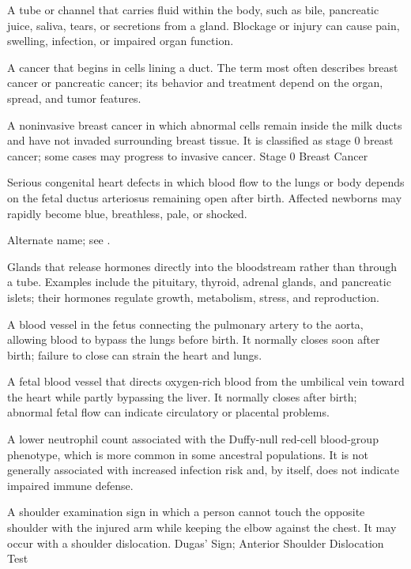  A tube or channel that carries fluid within the body, such as bile, pancreatic juice, saliva, tears, or secretions from a gland. Blockage or injury can cause pain, swelling, infection, or impaired organ function.

 A cancer that begins in cells lining a duct. The term most often describes breast cancer or pancreatic cancer; its behavior and treatment depend on the organ, spread, and tumor features.

 A noninvasive breast cancer in which abnormal cells remain inside the milk ducts and have not invaded surrounding breast tissue. It is classified as stage 0 breast cancer; some cases may progress to invasive cancer.
\synonyms
Stage 0 Breast Cancer

 Serious congenital heart defects in which blood flow to the lungs or body depends on the fetal ductus arteriosus remaining open after birth. Affected newborns may rapidly become blue, breathless, pale, or shocked.

 Alternate name; see .

 Glands that release hormones directly into the bloodstream rather than through a tube. Examples include the pituitary, thyroid, adrenal glands, and pancreatic islets; their hormones regulate growth, metabolism, stress, and reproduction.

 A blood vessel in the fetus connecting the pulmonary artery to the aorta, allowing blood to bypass the lungs before birth. It normally closes soon after birth; failure to close can strain the heart and lungs.

 A fetal blood vessel that directs oxygen-rich blood from the umbilical vein toward the heart while partly bypassing the liver. It normally closes after birth; abnormal fetal flow can indicate circulatory or placental problems.

 A lower neutrophil count associated with the Duffy-null red-cell blood-group phenotype, which is more common in some ancestral populations. It is not generally associated with increased infection risk and, by itself, does not indicate impaired immune defense.

 A shoulder examination sign in which a person cannot touch the opposite shoulder with the injured arm while keeping the elbow against the chest. It may occur with a shoulder dislocation.
\synonyms
Dugas' Sign; Anterior Shoulder Dislocation Test



